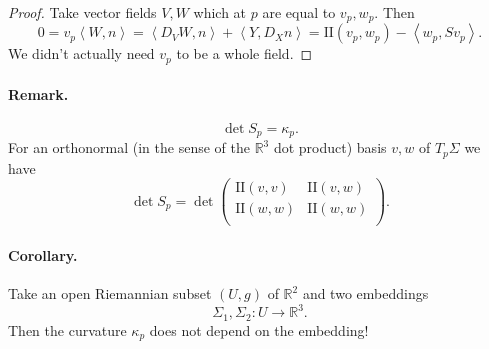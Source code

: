\begin{proof}
Take vector fields \( V, W \) which at \( p \) are equal to \( v_p, w_p \). Then
\[ 
    0 = v_p \left\langle W, n \right\rangle = \left\langle D_V W, n \right\rangle + \left\langle Y , D_X n \right\rangle = \mathrm{I\!I}(v_p, w_p) - \left\langle w_p, Sv_p \right\rangle.
\]
We didn't actually need \( v_p \) to be a whole field.
\end{proof}


\paragraph{Remark.}
\[ 
    \det S_p = \kappa_p. 
\]
For an orthonormal (in the sense of the \( \mathbb{R}^3 \) dot product) basis \( v, w \) of \( T_p \Sigma \) we have
\[ 
    \det S_p = \det \begin{pmatrix}
    \mathrm{I\!I}(v, v) & \mathrm{I\!I} (v, w) \\
    \mathrm{I\!I}(w, w) & \mathrm{I\!I} (w, w) \\
    \end{pmatrix}.
\]


\paragraph{Corollary.} Take an open Riemannian subset \( (U, g) \) of \( \mathbb{R}^2 \) and two embeddings
\[ 
    \Sigma_1, \Sigma_2 : U \to \mathbb{R}^3. 
\]
Then the curvature \( \kappa_p \) does not depend on the embedding!

